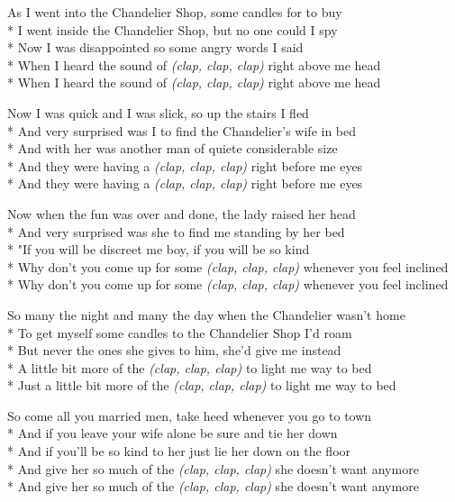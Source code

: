 \begin{SongText}
\begin{SongVerse}
As I went into the Chandelier Shop, some candles for to buy\\*%
I went inside the Chandelier Shop, but no one could I spy\\*%
Now I was disappointed so some angry words I said\\*%
When I heard the sound of \emph{(clap, clap, clap)} right above me head\\*%
When I heard the sound of \emph{(clap, clap, clap)} right above me head
\end{SongVerse}
\begin{SongVerse}
Now I was quick and I was slick, so up the stairs I fled\\*%
And very surprised was I to find the Chandelier's wife in bed\\*%
And with her was another man of quiete considerable size\\*%
And they were having a \emph{(clap, clap, clap)} right before me eyes\\*%
And they were having a \emph{(clap, clap, clap)} right before me eyes
\end{SongVerse}
\begin{SongVerse}
Now when the fun was over and done, the lady raised her head\\*%
And very surprised was she to find me standing by her bed\\*%
"If you will be discreet me boy, if you will be so kind\\*%
Why don't you come up for some \emph{(clap, clap, clap)} whenever you feel inclined\\*%
Why don't you come up for some \emph{(clap, clap, clap)} whenever you feel inclined 
\end{SongVerse}
\begin{SongVerse}
So many the night and many the day when the Chandelier wasn't home\\*%
To get myself some candles to the Chandelier Shop I'd roam\\*%
But never the ones she gives to him, she'd give me instead\\*%
A little bit more of the \emph{(clap, clap, clap)} to light me way to bed\\*%
Just a little bit more of the \emph{(clap, clap, clap)} to light me way to bed 
\end{SongVerse}
\begin{SongVerse}
So come all you married men, take heed whenever you go to town\\*%
And if you leave your wife alone be sure and tie her down\\*%
And if you'll be so kind to her just lie her down on the floor\\*%
And give her so much of the \emph{(clap, clap, clap)} she doesn't want anymore\\*%
And give her so much of the \emph{(clap, clap, clap)} she doesn't want anymore 
\end{SongVerse}
\end{SongText}
